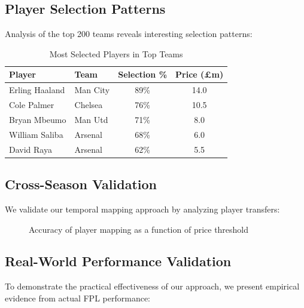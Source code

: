 \documentclass[12pt]{article}
\begin{document}
\subsection{Player Selection Patterns}

Analysis of the top 200 teams reveals interesting selection patterns:

\begin{table}[H]
\centering
\caption{Most Selected Players in Top Teams}
\begin{tabular}{llcc}
\toprule
Player & Team & Selection \% & Price (£m) \\
\midrule
Erling Haaland & Man City & 89\% & 14.0 \\
Cole Palmer & Chelsea & 76\% & 10.5 \\
Bryan Mbeumo & Man Utd & 71\% & 8.0 \\
William Saliba & Arsenal & 68\% & 6.0 \\
David Raya & Arsenal & 62\% & 5.5 \\
\bottomrule
\end{tabular}
\end{table}

\subsection{Cross-Season Validation}

We validate our temporal mapping approach by analyzing player transfers:

\begin{figure}[H]
\centering
{}
\caption{Accuracy of player mapping as a function of price threshold}
\end{figure}

\subsection{Real-World Performance Validation}

To demonstrate the practical effectiveness of our approach, we present empirical evidence from actual FPL performance:
\end{document}
